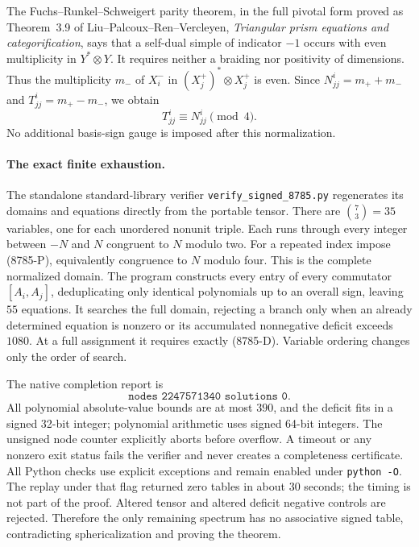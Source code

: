 The Fuchs--Runkel--Schweigert parity theorem, in the full pivotal form
proved as Theorem~3.9 of Liu--Palcoux--Ren--Vercleyen,
\emph{Triangular prism equations and categorification}, says that a
self-dual simple of indicator $-1$ occurs with even multiplicity in
$Y^*\otimes Y$. It requires neither a braiding nor positivity of dimensions.
Thus the multiplicity $m_-$ of $X_i^-$ in
$(X_j^+)^*\otimes X_j^+$ is even. Since
$N_{jj}^i=m_++m_-$ and $T_{jj}^i=m_+-m_-$, we obtain
\[
 T_{jj}^i\equiv N_{jj}^i\pmod4. \tag{8785-P}
\]
No additional basis-sign gauge is imposed after this normalization.

\paragraph{The exact finite exhaustion.}
The standalone standard-library verifier \texttt{verify\_signed\_8785.py}
regenerates its domains and equations directly from the portable tensor.
There are $\binom{7}{3}=35$ variables, one for each unordered nonunit
triple. Each runs through every integer between $-N$ and $N$ congruent
to $N$ modulo two. For a repeated index impose (8785-P), equivalently
congruence to $N$ modulo four. This is the complete normalized domain.
The program constructs every entry of every commutator $[A_i,A_j]$,
deduplicating only identical polynomials up to an overall sign, leaving
$55$ equations. It searches the full domain, rejecting a branch only
when an already determined equation is nonzero or its accumulated
nonnegative deficit exceeds $1080$. At a full assignment it requires
exactly (8785-D). Variable ordering changes only the order of search.

The native completion report is
\[
 \texttt{nodes 2247571340 solutions 0}.
\]
All polynomial absolute-value bounds are at most $390$, and the deficit
fits in a signed 32-bit integer; polynomial arithmetic uses signed
64-bit integers. The unsigned node counter explicitly aborts before
overflow. A timeout or any nonzero exit status fails the verifier and
never creates a completeness certificate. All Python checks use
explicit exceptions and remain enabled under \texttt{python -O}.
The replay under that flag returned zero tables in about $30$ seconds;
the timing is not part of the proof. Altered tensor and altered deficit
negative controls are rejected. Therefore the only remaining spectrum
has no associative signed table, contradicting sphericalization and
proving the theorem.

